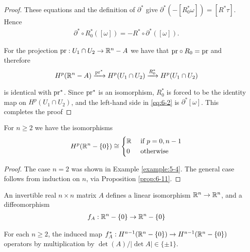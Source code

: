 \begin{proof}
These equations and the definition of $\partial^*$ give $\partial^*(-[R^*_0\omega]) = [R^*\tau]$. Hence 
\begin{align}\label{eq:6-2}
  \partial^*\circ R^*_0([\omega])
  = -R^*\circ\partial^*([\omega]).
\end{align}

For the projection $\mathrm{pr}:U_1\cap U_2\to{\ensuremath{\mathbb{R}}}^n-A$ we have that $\mathrm{pr}\circ R_0 = \mathrm{pr}$ and therefore 
\begin{align*}
  H^p(\RR^n-A)\xra[\R{pr}^*]H^p(U_1\cap U_2)\xra[R^*_0] H^p(U_1\cap U_2)
\end{align*}

is identical with $\mathrm{pr}^*$. Since $\mathrm{pr}^*$ is an isomorphism, $R^*_0$ is forced to be the identity
map on $H^p(U_1\cap U_2)$, and the left-hand side in \eqref{eq:6-2} is $\partial^*[\omega]$. This completes the proof
\end{proof}

\begin{theorem}\label{theorem:6-13}
  For $n\ge 2$ we have the isomorphisms
  \begin{align*}
    H^p({\mathbb{R}}^n -\{0\}) \cong \left\{\begin{aligned}
      & {\mathbb{R}} && \text{ if } p=0, n-1\\
      & 0 && \text{ otherwise}
    \end{aligned}\right.
  \end{align*}
\end{theorem}

\begin{proof}
  The case $n = 2$ was shown in Example \ref{example:5-4}. The general case follows
from induction on $n$, via Proposition \ref{prop:6-11}.
\end{proof}


An invertible real $n\times n$ matrix $A$ defines a linear isomorphism ${\mathbb{R}}^n\to{\ensuremath{\mathbb{R}}}^n$, and
a diffeomorphism
\begin{align*}
  f_A: {\mathbb{R}}^n-\{0\}\to {\ensuremath{\mathbb{R}}}^n-\{0\}
\end{align*}

\begin{lemma}\label{lemma:6-14}
  For each $n\ge 2$, the induced map $f^*_A:H^{n-1}({\mathbb{R}}^n - \{0\})\to H^{n-1}({\mathbb{R}}^n - \{0\})$ operators by 
  multiplication by $\det(A)/|\det A|\in \{\pm 1\}$.
\end{lemma}

